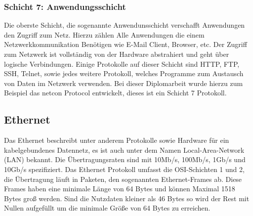 \documentclass[a4paper,14pt,headsepline]{scrartcl}
\begin{document}
\subsubsection*{Schicht 7: Anwendungsschicht}
Die oberste Schicht, die sogenannte Anwendunsschicht verschafft Anwendungen den Zugriff zum Netz. Hierzu zählen Alle Anwendungen die einem Netzwerkkommunikation Benötigen wie E-Mail Client, Browser, etc. Der Zugriff zum Netzwerk ist vollständig von der Hardware abstrahiert und geht über logische Verbindungen. Einige Protokolle auf dieser Schicht sind HTTP, FTP, SSH, Telnet, sowie jedes weitere Protokoll, welches Programme zum Austausch von Daten im Netzwerk verwenden. Bei dieser Diplomarbeit wurde hierzu zum Beispiel das netcon Protocol entwickelt, dieses ist ein Schicht 7 Protokoll.

\newpage 
\subsection{Ethernet}
Das Ethernet beschreibt unter anderem Protokolle sowie Hardware für ein kabelgebundenes Datennetz, es ist auch unter dem Namen Local-Area-Network (LAN) bekannt. Die Übertragungsraten sind mit 10Mb/s, 100Mb/s, 1Gb/s  und 10Gb/s spezifiziert. Das Ethernet Protokoll umfasst die OSI-Schichten 1 und 2, die Übertragung läuft in Paketen, den sogenannten Ethernet-Frames ab. Diese Frames haben eine minimale Länge von 64 Bytes und können Maximal 1518 Bytes groß werden. Sind die Nutzdaten kleiner als 46 Bytes so wird der Rest mit Nullen aufgefüllt um die minimale Größe von 64 Bytes zu erreichen.

\begin{figure}[h]
\begin{center}
\end{center}
\end{figure}
\end{document}

